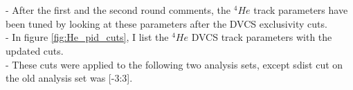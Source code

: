 
\section*{}

\subsection*{}
- After the first and the second round comments, the $^{4}He$ track parameters 
have been tuned by looking at these parameters after the DVCS exclusivity 
cuts.\\
- In figure \ref{fig:He_pid_cuts}, I list the $^{4}He$ DVCS track parameters 
with the updated cuts.\\
- These cuts were applied to the following two analysis sets, except sdist cut 
on the old analysis set was [-3:3].\\

